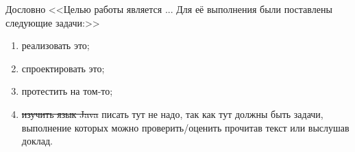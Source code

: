 \label{sec:task}
 Дословно <<Целью работы является ... Для её выполнения были поставлены следующие задачи:>>
 \begin{enumerate}
 \item  реализовать это;
 \item  спроектировать это;
 \item  протестить на том-то;
 \item \sout{изучить язык Java} писать тут не надо, так как тут должны быть задачи, выполнение которых можно проверить/оценить прочитав текст или выслушав доклад.
 \end{enumerate}
